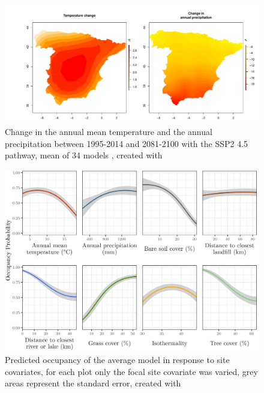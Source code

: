 \documentclass[12pt]{scrartcl} %
\begin{document}
\begin{figure}[H]
	\centering
	\includegraphics[width=\linewidth]{img/climate_change}
	\caption{Change in the annual mean temperature and the annual precipitation between 1995-2014 and 2081-2100 with the SSP2 4.5 pathway, mean of 34 models \parencite{ipcc}, created with \textcite{raster}}
	\label{fig:climate_change}
\end{figure}


\begin{figure}[H]
	\centering
	\includegraphics[width=\linewidth]{img/avg_model_site_covariates}
	\caption{Predicted occupancy of the average model in response to site covariates, for each plot only the focal site covariate was varied, grey areas represent the standard error, created with \textcite{ggplot2}}	
	\label{fig:avg_site_covs}
\end{figure}
\end{document}
